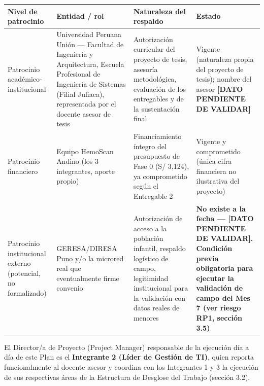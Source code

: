 \documentclass[11pt,a4paper]{article}
\begin{document}
{\small
\begin{longtable}[]{@{}
  >{\raggedright\arraybackslash}p{}
  >{\raggedright\arraybackslash}p{}
  >{\raggedright\arraybackslash}p{}
  >{\raggedright\arraybackslash}p{}@{}}
\toprule\noalign{}
\begin{minipage}[b]{\linewidth}\raggedright
Nivel de patrocinio
\end{minipage} & \begin{minipage}[b]{\linewidth}\raggedright
Entidad / rol
\end{minipage} & \begin{minipage}[b]{\linewidth}\raggedright
Naturaleza del respaldo
\end{minipage} & \begin{minipage}[b]{\linewidth}\raggedright
Estado
\end{minipage} \\
\midrule\noalign{}
\endhead
\bottomrule\noalign{}
\endlastfoot
Patrocinio académico-institucional & Universidad Peruana Unión --- Facultad de Ingeniería y Arquitectura, Escuela Profesional de Ingeniería de Sistemas (Filial Juliaca), representada por el docente asesor de tesis & Autorización curricular del proyecto de tesis, asesoría metodológica, evaluación de los entregables y de la sustentación final & Vigente (naturaleza propia del proyecto de tesis); nombre del asesor \textbf{{[}DATO PENDIENTE DE VALIDAR{]}} \\
Patrocinio financiero & Equipo HemoScan Andino (los 3 integrantes, aporte propio) & Financiamiento íntegro del presupuesto de Fase 0 (S/ 3,124), ya comprometido según el Entregable 2 & Vigente y comprometido (única cifra financiera no ilustrativa del proyecto) \\
Patrocinio institucional externo (potencial, no formalizado) & GERESA/DIRESA Puno y/o la microred real que eventualmente firme convenio & Autorización de acceso a la población infantil, respaldo logístico de campo, legitimidad institucional para la validación con datos reales de menores & \textbf{No existe a la fecha --- {[}DATO PENDIENTE DE VALIDAR{]}. Condición previa obligatoria para ejecutar la validación de campo del Mes 7 (ver riesgo RP1, sección 3.5)} \\
\end{longtable}
}

El Director/a de Proyecto (Project Manager) responsable de la ejecución día a día de este Plan es el \textbf{Integrante 2 (Líder de Gestión de TI)}, quien reporta funcionalmente al docente asesor y coordina con los Integrantes 1 y 3 la ejecución de sus respectivas áreas de la Estructura de Desglose del Trabajo (sección 3.2).
\end{document}
